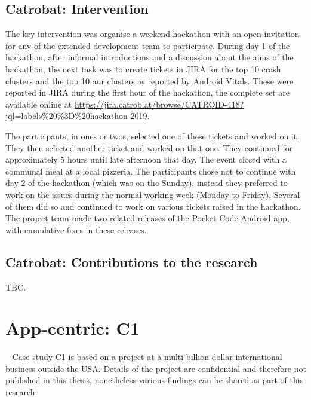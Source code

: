 \subsection{Catrobat: Intervention}
The key intervention was organise a weekend hackathon with an open invitation for any of the extended development team to participate. During day 1 of the hackathon, after informal introductions and a discussion about the aims of the hackathon, the next task was to create tickets in JIRA for the top 10 crash clusters and the top 10 \acrshort{anr} clusters as reported by Android Vitals. These were reported in JIRA during the first hour of the hackathon, the complete set are available online at \url{https://jira.catrob.at/browse/CATROID-418?jql=labels\%20\%3D\%20hackathon-2019}. 

The participants, in ones or twos, selected one of these tickets and worked on it. They then selected another ticket and worked on that one. They continued for approximately 5 hours until late afternoon that day. The event closed with a communal meal at a local pizzeria. The participants chose not to continue with day 2 of the hackathon (which was on the Sunday), instead they preferred to work on the issues during the normal working week (Monday to Friday). Several of them did so and continued to work on various tickets raised in the hackathon. The project team made two related releases of the Pocket Code Android app, with cumulative fixes in these releases.

\subsection{Catrobat: Contributions to the research}
TBC.




\section{App-centric: C1}~\label{case-study-overview-C1}
Case study C1 is based on a project at a multi-billion dollar international business outside the USA. Details of the project are confidential and therefore not published in this thesis, nonetheless various findings can be shared as part of this research. 

